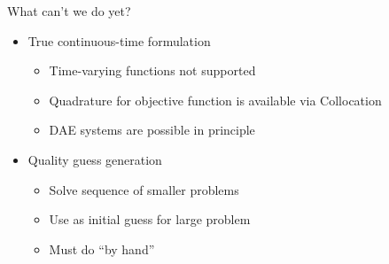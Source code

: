 \documentclass[xcolor=dvipsnames]{beamer}
\begin{document}
\begin{frame}{What can't we do yet?}
    \begin{itemize}
        \item True continuous-time formulation
        \begin{itemize}
            \item Time-varying functions not supported
            \item Quadrature for objective function is available via Collocation
            \item DAE systems are possible in principle
        \end{itemize}
        \item Quality guess generation
        \begin{itemize}
            \item Solve sequence of smaller problems
            \item Use as initial guess for large problem
            \item Must do ``by hand''
        \end{itemize}
    \end{itemize}
\end{frame}

%
%
\end{document}
